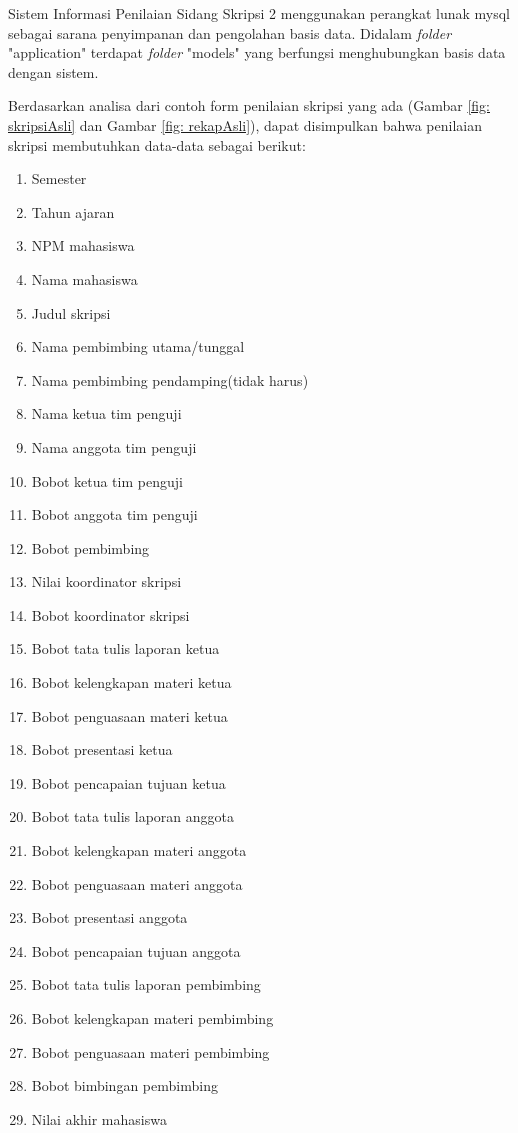 	Sistem Informasi Penilaian Sidang Skripsi 2 menggunakan perangkat lunak mysql sebagai sarana penyimpanan dan pengolahan basis data. Didalam \textit{folder} "application" terdapat \textit{folder} "models" yang berfungsi menghubungkan basis data dengan sistem. 
	
	Berdasarkan analisa dari contoh form penilaian skripsi yang ada (Gambar \ref{fig: skripsiAsli} dan Gambar \ref{fig: rekapAsli}), dapat disimpulkan bahwa penilaian skripsi membutuhkan data-data sebagai berikut:
		
		\begin{enumerate}
			\item Semester
			\item Tahun ajaran
			\item NPM mahasiswa 
			\item Nama mahasiswa
			\item Judul skripsi
			\item Nama pembimbing utama/tunggal
			\item Nama pembimbing pendamping(tidak harus)
			\item Nama ketua tim penguji
			\item Nama anggota tim penguji
			\item Bobot ketua tim penguji
			\item Bobot anggota tim penguji
			\item Bobot pembimbing
			\item Nilai koordinator skripsi
			\item Bobot koordinator skripsi
			\item Bobot tata tulis laporan ketua
			\item Bobot kelengkapan materi ketua
			\item Bobot penguasaan materi ketua
			\item Bobot presentasi ketua
			\item Bobot pencapaian tujuan ketua
			\item Bobot tata tulis laporan anggota
			\item Bobot kelengkapan materi anggota
			\item Bobot penguasaan materi anggota
			\item Bobot presentasi anggota
			\item Bobot pencapaian tujuan anggota
			\item Bobot tata tulis laporan pembimbing
			\item Bobot kelengkapan materi pembimbing
			\item Bobot penguasaan materi pembimbing
			\item Bobot bimbingan pembimbing
			\item Nilai akhir mahasiswa
		\end{enumerate}
	
